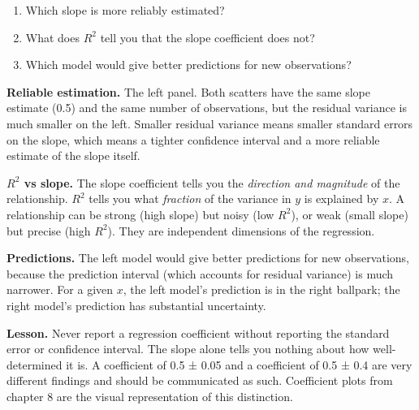 \documentclass[
  letterpaper,
  11pt,
  twoside,
  openany]{scrbook}
\providecommand{\tightlist}{%
  \setlength{\itemsep}{0pt}\setlength{\parskip}{0pt}}
\begin{document}
\begin{enumerate}
\def\labelenumi{\arabic{enumi}.}
\tightlist
\item
  Which slope is more reliably estimated?
\item
  What does \(R^2\) tell you that the slope coefficient does not?
\item
  Which model would give better predictions for new observations?
\end{enumerate}

\begin{tcolorbox}[enhanced jigsaw, arc=.35mm, bottomrule=.15mm, bottomtitle=1mm, breakable, colback=white, colbacktitle=quarto-callout-note-color!10!white, colframe=quarto-callout-note-color-frame, coltitle=black, left=2mm, leftrule=.75mm, opacityback=0, opacitybacktitle=0.6, rightrule=.15mm, title=\textcolor{quarto-callout-note-color}{\faInfo}\hspace{0.5em}{Solution to Problem 8}, titlerule=0mm, toprule=.15mm, toptitle=1mm]

\textbf{Reliable estimation.} The left panel. Both scatters have the
same slope estimate (0.5) and the same number of observations, but the
residual variance is much smaller on the left. Smaller residual variance
means smaller standard errors on the slope, which means a tighter
confidence interval and a more reliable estimate of the slope itself.

\textbf{\(R^2\) vs slope.} The slope coefficient tells you the
\emph{direction and magnitude} of the relationship. \(R^2\) tells you
what \emph{fraction} of the variance in \(y\) is explained by \(x\). A
relationship can be strong (high slope) but noisy (low \(R^2\)), or weak
(small slope) but precise (high \(R^2\)). They are independent
dimensions of the regression.

\textbf{Predictions.} The left model would give better predictions for
new observations, because the prediction interval (which accounts for
residual variance) is much narrower. For a given \(x\), the left model's
prediction is in the right ballpark; the right model's prediction has
substantial uncertainty.

\textbf{Lesson.} Never report a regression coefficient without reporting
the standard error or confidence interval. The slope alone tells you
nothing about how well-determined it is. A coefficient of 0.5 ± 0.05 and
a coefficient of 0.5 ± 0.4 are very different findings and should be
communicated as such. Coefficient plots from chapter 8 are the visual
representation of this distinction.

\end{tcolorbox}
\end{document}
